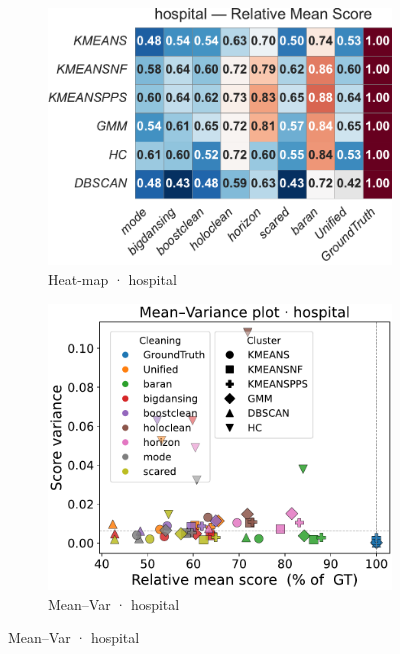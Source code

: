 \documentclass[10pt]{article} %
\numberwithin{equation}{section}
\begin{document}
\begin{figure}[htbp]
  \vspace{0.6em}
  \begin{subfigure}{0.33\linewidth}
    \centering
    \includegraphics[width=\linewidth]{figures/5.3.1graph/heatmap_rel_hospital.pdf}
    \caption{Heat-map · hospital}
  \end{subfigure}\hfill
  \begin{subfigure}{0.32\linewidth}
    \centering
    \includegraphics[width=\linewidth]{figures/5.3.1graph/mean_var_scatter_hospital.pdf}
    \caption{Mean–Var · hospital}
  \end{subfigure}\hfill

\end{figure}
\end{document}
